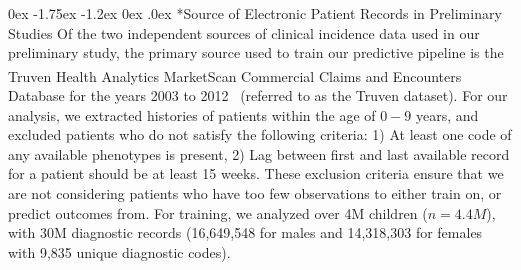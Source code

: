 \documentclass[onecolumn, compsoc,11pt]{IEEEtran}
\makeatletter
\renewcommand\subsection{\@startsection {subsection}{2}{\z@}%
                                   {0ex \@plus -1.75ex \@minus -1.2ex}%
                                   {0ex \@plus.0ex}%
                                   {\fontsize{11}{11}\selectfont\bfseries\sffamily\color{black}}}
\makeatother
\begin{document}
\subsection*{Source of Electronic Patient Records in Preliminary Studies}
Of the two independent sources of clinical incidence data used in our preliminary study,  the primary source used to train our predictive pipeline  is the Truven Health Analytics  MarketScan\textsuperscript{\textregistered} Commercial Claims and Encounters Database for the years 2003 to 2012~\cite{hansen2017truven} (referred to  as the Truven dataset). 
For our analysis, we extracted histories of patients within the age of $0-9$ years, and excluded  patients who do not satisfy the following criteria: 1) At least one code of any available phenotypes is present, 2) Lag between first and last available record for a patient should be at least 15 weeks. These exclusion criteria ensure that we are not considering patients who have too few observations to either train on, or predict outcomes from. 
 For training, we analyzed over 4M children ($n=4.4M$), with 30M diagnostic records (16,649,548 for males and  14,318,303  for females with 9,835 unique diagnostic codes).
\end{document}
